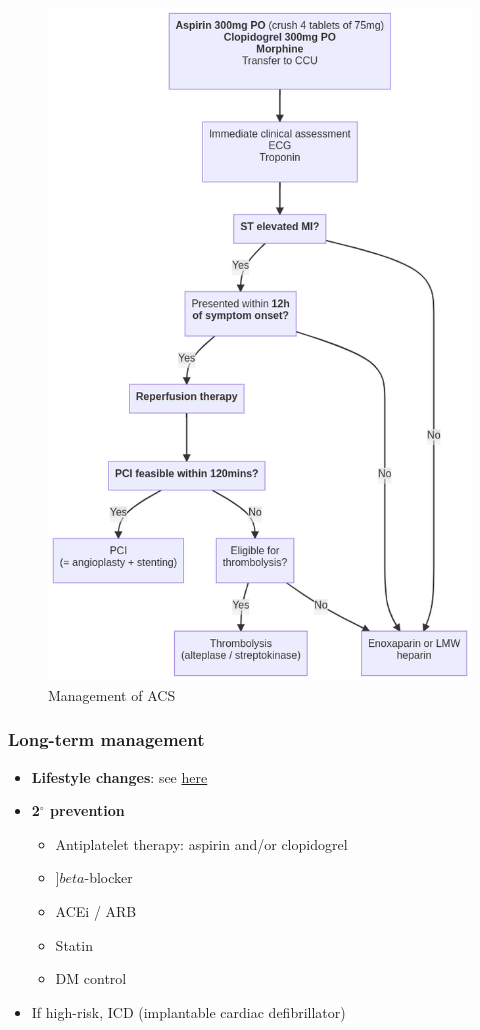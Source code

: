\documentclass[
  12pt,
]{memoir}
\providecommand{\tightlist}{%
  \setlength{\itemsep}{0pt}\setlength{\parskip}{0pt}}
\begin{document}
\begin{figure}
\centering
\includegraphics[width=.65\textwidth]{../assets/med/MI-mx.png}
\vspace{5mm}
\caption{Management of ACS}
\end{figure}

\hypertarget{long-term-management}{%
\subsubsection{Long-term management}\label{long-term-management}}

\begin{itemize}
\tightlist
\item
  \textbf{Lifestyle changes}: see \hyperref[item:life]{here}
\item
  \textbf{2\(^\circ\) prevention}

  \begin{itemize}
  \tightlist
  \item
    Antiplatelet therapy: aspirin and/or clopidogrel
  \item
    \(]beta\)-blocker
  \item
    ACEi / ARB
  \item
    Statin
  \item
    DM control
  \end{itemize}
\item
  If high-risk, ICD (implantable cardiac defibrillator)
\end{itemize}
\end{document}
